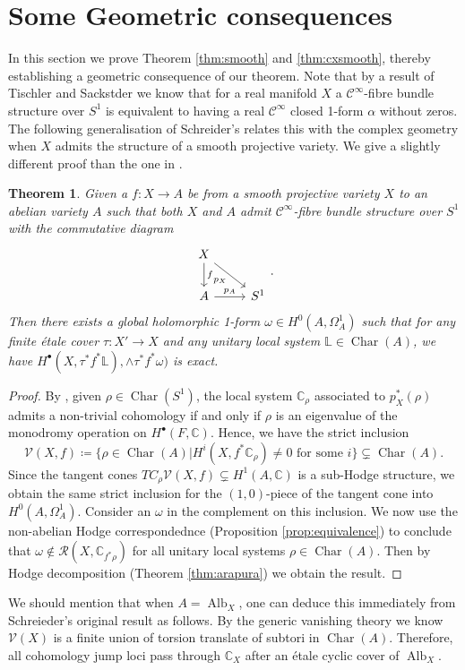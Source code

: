 \documentclass[12pt,reqno]{amsart}
\newtheorem{theorem}{Theorem}
\theoremstyle{question}
\theoremstyle{definition}
\theoremstyle{remark}
\theoremstyle{cited}
\theoremstyle{citeddef}
\DeclareMathOperator{\Alb}{Alb}
\DeclareMathOperator{\Char}{Char}
\newcommand{\sR}{\mathcal{R}}
\newcommand\sV{{\mathcal V}}
\newcommand{\bbC}{\mathbb{C}}
\newcommand{\bbL}{\mathbb{L}}
\newcommand{\scrC}{\mathscr{C}}
\begin{document}
\section{Some Geometric consequences}
In this section we prove Theorem \ref{thm:smooth} and \ref{thm:cxsmooth}, thereby establishing a geometric consequence of our theorem. 
Note that by a result of Tischler \cite[Theorem 1]{Tis70} and Sackstder \cite[p.\ 96]{Sac65} we know that for a real manifold $X$
a $\scrC^{\infty}$-fibre bundle structure over $S^1$ is equivalent to having a real $\scrC^{\infty}$ closed 1-form $\alpha$ without zeros. 
The following generalisation of Schreider's \cite[Theorem 1.2]{Sch19} relates this with the complex geometry when $X$ admits
the structure of a smooth projective variety. We give a slightly different proof than the one in \cite{Sch19}.   

\begin{theorem}\label{thm:schreieder}
Given a $f\colon X\to A$ be from a smooth projective variety $X$ to an abelian variety $A$ such that
both $X$ and $A$ admit $\scrC^{\infty}$-fibre bundle structure over $S^1$ with the commutative diagram
\[\begin{tikzcd}
	X\ar[dr, "p_X"']\ar[d, "f"]& \\
	A\ar[r, "p_A"]&S^1
\end{tikzcd}.\]  
Then there exists a global holomorphic 1-form $\omega\in H^0(A,\Omega_A^1)$ such that for any finite \'etale cover $\tau\colon X' \to X$ and
any unitary local system $\bbL\in \Char(A)$, we have $H^{\bullet}(X, \tau^*f^*\bbL), \wedge\tau^*f^*\omega)$ is exact. 
\label{thm:schreieder}
\end{theorem} 

\begin{proof}
By \cite[Proposition 5.4]{LW18}, given $\rho\in \Char(S^1)$, the local system $\bbC_{\rho}$ associated to $p_X^*(\rho)$ admits
a non-trivial cohomology if and only if $\rho$ is an eigenvalue of the monodromy operation on $H^{\bullet}(F, \bbC)$. Hence, 
we have the strict inclusion
\[\sV(X, f) \coloneqq \{\rho\in\Char(A)| H^i(X, f^*\bbC_{\rho}) \neq 0 \text{ for some }i\}\subsetneq \Char(A).\]
Since the tangent cones $TC_{\rho}\sV(X, f)\subsetneq H^1(A, \bbC)$ is a sub-Hodge structure, we obtain the same strict inclusion
for the $(1,0)$-piece of the tangent cone into $H^0(A, \Omega_A^1)$. Consider an $\omega$ in the complement on this inclusion. We now use the non-abelian Hodge correspondednce (Proposition
\ref{prop:equivalence}) to conclude that $\omega\notin \sR(X, \bbC_{f^*\rho})$ for all unitary local systems $\rho\in \Char(A)$. Then
by Hodge decomposition (Theorem \ref{thm:arapura}) we obtain the result.

\end{proof}
We should mention that when $A = \Alb_X$, one can deduce this immediately from Schreieder's original result as follows. By
the generic vanishing theory we know $\sV(X)$ is a finite union of torsion translate of subtori in $\Char(A)$. Therefore, 
all cohomology jump loci pass through $\bbC_X$ after an \'etale cyclic cover of $\Alb_X$.
\end{document}
